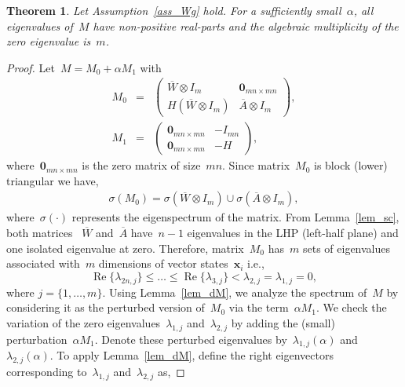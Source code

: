 \documentclass[letterpaper, 10pt, conference]{ieeeconf}
\newtheorem{thm}{Theorem}
\def\mb{\mathbf}
\begin{document}
\begin{thm} \label{thm_zeroeig}
Let Assumption~\ref{ass_Wg} hold. For a sufficiently small~$\alpha$, all eigenvalues of~$M$ have non-positive real-parts and the algebraic multiplicity of the zero eigenvalue is~$m$. 
\end{thm}
\begin{proof}
Let~$M=M_0+\alpha M_1$ with 
\begin{eqnarray}\nonumber
	M_0 &=&  \left(\begin{array}{cc} \overline{W} \otimes I_m & \mb{0}_{mn\times mn} \\ H(\overline{W} \otimes I_m) & \overline{A}\otimes I_m \end{array} \right),\\\nonumber
	M_1 &=& \left(\begin{array}{cc} \mb{0}_{mn\times mn} & - {I_{mn}} \\ {\mb{0}_{mn\times mn}} & - H \end{array} \right),
\end{eqnarray}
where~$\mb{0}_{mn\times mn}$ is the zero matrix of size~$mn$.
Since matrix~$M_0$ is block (lower) triangular we have,
\begin{eqnarray}
	\sigma(M_0) = \sigma(\overline{W} \otimes I_m) \cup \sigma(\overline{A} \otimes I_m),
\end{eqnarray}
where~$\sigma(\cdot)$ represents the eigenspectrum of the matrix. From Lemma~\ref{lem_sc}, both matrices ~$\overline{W}$ and~$\overline{A}$ have~$n-1$ eigenvalues in the LHP (left-half plane) and one isolated eigenvalue at zero. Therefore,  matrix~$M_0$ has~$m$ sets of eigenvalues associated with~$m$ dimensions of vector states~$\mb{x}_i$ i.e.,
$$\operatorname{Re}\{\lambda_{2n,j}\} \leq \ldots \leq \operatorname{Re}\{\lambda_{3,j}\} < \lambda_{2,j} = \lambda_{1,j} = 0,$$ where $j=\{1,\ldots,m\}.$
Using Lemma~\ref{lem_dM}, we analyze  the spectrum of~$M$ by considering it as the perturbed version of~$M_0$ via the term~$\alpha M_1$. We check the variation of the zero eigenvalues~$\lambda_{1,j}$ and~$\lambda_{2,j}$ by adding the (small) perturbation~$\alpha M_1$. Denote these perturbed eigenvalues by~$\lambda_{1,j}(\alpha)$ and~$\lambda_{2,j}(\alpha)$. To apply Lemma~\ref{lem_dM}, define the right eigenvectors corresponding to~$\lambda_{1,j}$ and~$\lambda_{2,j}$ as,

\end{proof}
\end{document}
